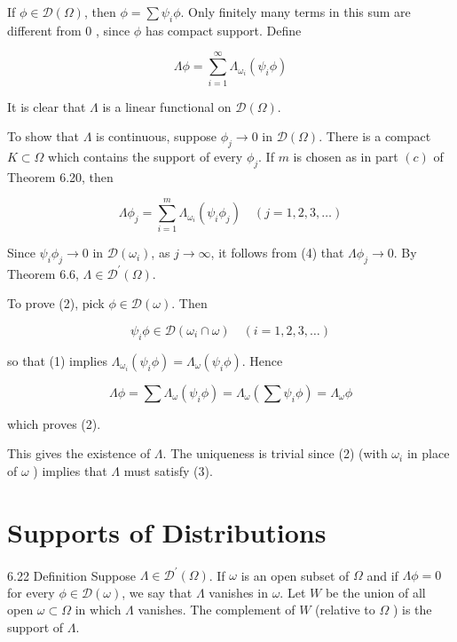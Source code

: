 \documentclass[10pt]{article}
\begin{document}
If $\phi \in \mathscr{D}(\Omega)$, then $\phi=\sum \psi_{i} \phi$. Only finitely many terms in this sum are different from 0 , since $\phi$ has compact support. Define

$$
\Lambda \phi=\sum_{i=1}^{\infty} \Lambda_{\omega_{i}}\left(\psi_{i} \phi\right)
$$

It is clear that $\Lambda$ is a linear functional on $\mathscr{D}(\Omega)$.

To show that $\Lambda$ is continuous, suppose $\phi_{j} \rightarrow 0$ in $\mathscr{D}(\Omega)$. There is a compact $K \subset \Omega$ which contains the support of every $\phi_{j}$. If $m$ is chosen as in part $(c)$ of Theorem 6.20, then

$$
\Lambda \phi_{j}=\sum_{i=1}^{m} \Lambda_{\omega_{i}}\left(\psi_{i} \phi_{j}\right) \quad(j=1,2,3, \ldots)
$$

Since $\psi_{i} \phi_{j} \rightarrow 0$ in $\mathscr{D}\left(\omega_{i}\right)$, as $j \rightarrow \infty$, it follows from (4) that $\Lambda \phi_{j} \rightarrow 0$. By Theorem 6.6, $\Lambda \in \mathscr{D}^{\prime}(\Omega)$.

To prove (2), pick $\phi \in \mathscr{D}(\omega)$. Then

$$
\psi_{i} \phi \in \mathscr{D}\left(\omega_{i} \cap \omega\right) \quad(i=1,2,3, \ldots)
$$

so that (1) implies $\Lambda_{\omega_{i}}\left(\psi_{i} \phi\right)=\Lambda_{\omega}\left(\psi_{i} \phi\right)$. Hence

$$
\Lambda \phi=\sum \Lambda_{\omega}\left(\psi_{i} \phi\right)=\Lambda_{\omega}\left(\sum \psi_{i} \phi\right)=\Lambda_{\omega} \phi
$$

which proves (2).

This gives the existence of $\Lambda$. The uniqueness is trivial since (2) (with $\omega_{i}$ in place of $\omega$ ) implies that $\Lambda$ must satisfy (3).

\section{Supports of Distributions}
6.22 Definition Suppose $\Lambda \in \mathscr{D}^{\prime}(\Omega)$. If $\omega$ is an open subset of $\Omega$ and if $\Lambda \phi=0$ for every $\phi \in \mathscr{D}(\omega)$, we say that $\Lambda$ vanishes in $\omega$. Let $W$ be the union of all open $\omega \subset \Omega$ in which $\Lambda$ vanishes. The complement of $W$ (relative to $\Omega$ ) is the support of $\Lambda$.
\end{document}
